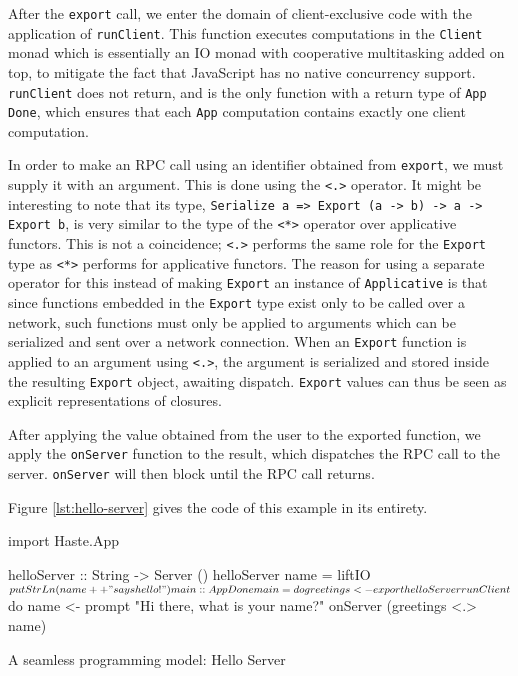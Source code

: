 \documentclass[preprint]{sigplanconf}
\begin{document}
After the \lstinline!export! call, we enter the domain of client-exclusive code
with the application of \lstinline!runClient!. This function executes
computations in the \lstinline!Client! monad which is essentially an
IO monad with cooperative multitasking added on top, to mitigate the fact that
JavaScript has no native concurrency support. \lstinline!runClient! does not
return, and is the only function with a return type of \lstinline!App Done!,
which ensures that each \lstinline!App! computation contains exactly one client
computation.

In order to make an RPC call using an identifier obtained from
\lstinline!export!, we must supply it with an argument. This is done using the
\lstinline!<.>! operator. It might be interesting to note that its type,
\linebreak
\lstinline!Serialize a => Export (a -> b) -> a -> Export b!,
is very similar to the type of the \lstinline!<*>! operator over applicative
functors. This is not a coincidence; \lstinline!<.>! performs the same role
for the \lstinline!Export! type as \lstinline!<*>! performs for applicative
functors. The reason for using a separate operator for this instead of making
\lstinline!Export! an instance of \lstinline!Applicative! is that since
functions embedded in the \lstinline!Export! type exist only to be called over
a network, such functions must only be applied to arguments which can be
serialized and sent over a network connection. When an \lstinline!Export!
function is applied to an argument using \lstinline!<.>!, the argument is
serialized and stored inside the resulting \lstinline!Export! object, awaiting
dispatch. \lstinline!Export! values can thus be seen as explicit
representations of closures.

After applying the value obtained from the user to the exported function,
we apply the \lstinline!onServer! function to the result, which dispatches
the RPC call to the server. \lstinline!onServer! will then block until the
RPC call returns.

Figure \ref{lst:hello-server} gives the code of this example in its entirety.

\begin{listingfloat}
\begin{code}
import Haste.App

helloServer :: String -> Server ()
helloServer name =
  liftIO $ putStrLn (name ++ " says hello!")

main :: App Done
main = do
  greetings <- export helloServer

  runClient $ do
    name <- prompt "Hi there, what is your name?"
    onServer (greetings <.> name)
\end{code}
\caption{A seamless programming model: Hello Server}
\label{lst:hello-server}
\end{listingfloat}
\end{document}
